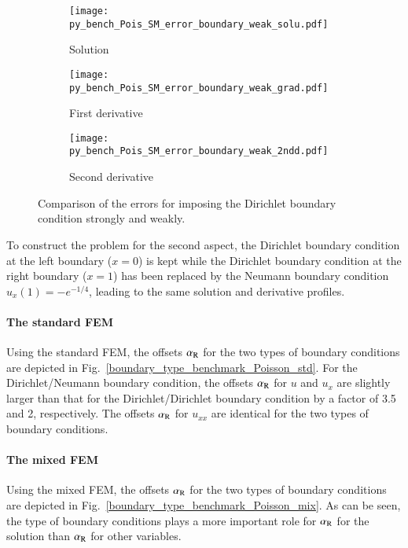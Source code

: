 \documentclass[review,3p]{elsarticle}
\begin{document}
\begin{figure}[!ht]
    \begin{subfigure}{5.5cm}
        \texttt{[image: py\_bench\_Pois\_SM\_error\_boundary\_weak\_solu.pdf]}
        \caption{Solution}
        \label{py_bench_Pois_SM_error_boundary_weak_solu}
    \end{subfigure}
    \hspace{-0.2cm}
    \begin{subfigure}{5.5cm}
        \texttt{[image: py\_bench\_Pois\_SM\_error\_boundary\_weak\_grad.pdf]}
        \caption{First derivative}
        \label{py_bench_Pois_SM_error_boundary_weak_grad}
    \end{subfigure}
    \hspace{-0.2cm}
    \begin{subfigure}{5.5cm}
        \texttt{[image: py\_bench\_Pois\_SM\_error\_boundary\_weak\_2ndd.pdf]}
        \caption{Second derivative}
        \label{py_bench_Pois_SM_error_boundary_weak_2ndd}
    \end{subfigure}
\caption{Comparison of the errors for imposing the Dirichlet boundary condition strongly and weakly.}
\label{py_bench_Pois_SM_error_boundary_weak}
\end{figure}

To construct the problem for the second aspect, the Dirichlet boundary condition at the left boundary ($x=0$) is kept while the Dirichlet boundary condition at the right boundary ($x=1$) has been replaced by the Neumann boundary condition $u_x (1) = -e^{-1/4}$, leading to the same solution and derivative profiles. 


\paragraph{The standard FEM}
Using the standard FEM, the offsets $\alpha_{\rm R}$ for the two types of boundary conditions are depicted in Fig.~\ref{boundary_type_benchmark_Poisson_std}. 
For the Dirichlet/Neumann boundary condition, the offsets $\alpha_{\rm R}$ for $u$ and $u_x$ are slightly larger than that for the Dirichlet/Dirichlet boundary condition by a factor of 3.5 and 2, respectively. The offsets $\alpha_{\rm R}$ for $u_{xx}$ are identical for the two types of boundary conditions.

\paragraph{The mixed FEM}
Using the mixed FEM, the offsets $\alpha_{\rm R}$ for the two types of boundary conditions are depicted in Fig.~\ref{boundary_type_benchmark_Poisson_mix}.
As can be seen, the type of boundary conditions plays a more important role for $\alpha_{\rm R}$ for the solution than $\alpha_{\rm R}$ for other variables.
\end{document}

